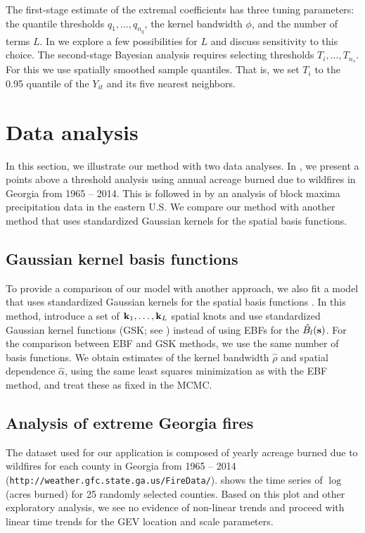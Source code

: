 The first-stage estimate of the extremal coefficients has three tuning parameters: the quantile thresholds $q_1,...,q_{n_q}$, the kernel bandwidth $\phi$, and the number of terms $L$.
In  we explore a few possibilities for $L$ and discuss sensitivity to this choice.
The second-stage Bayesian analysis requires selecting thresholds $T_i,...,T_{n_s}$.  For this we use spatially smoothed sample quantiles.
That is, we set $T_i$ to the 0.95 quantile of the $Y_{it}$ and its five nearest neighbors.

\section{Data analysis}\label{ebs:analysis}
In this section, we illustrate our method with two data analyses.
In , we present a points above a threshold analysis using annual acreage burned due to wildfires in Georgia from 1965 -- 2014.
This is followed in  by an analysis of block maxima precipitation data in the eastern U.S.
We compare our method with another method that uses standardized Gaussian kernels for the spatial basis functions.

\subsection{Gaussian kernel basis functions}
To provide a comparison of our model with another approach, we also fit a model that uses standardized Gaussian kernels for the spatial basis functions \citep{Reich2012}.
In this method, \citeauthor{Reich2012} introduce a set of $\mathbf{k}_1, \ldots, \mathbf{k}_L$ spatial knots and use standardized Gaussian kernel functions (GSK; see ) instead of using EBFs for the $\hat{B_l}(\mathbf{s})$.
For the comparison between EBF and GSK methods, we use the same number of basis functions.
We obtain estimates of the kernel bandwidth $\hat{\rho}$ and spatial dependence $\hat{\alpha}$, using the same least squares minimization as with the EBF method, and treat these as fixed in the MCMC.

\subsection{Analysis of extreme Georgia fires}\label{ebs:georgia}
The dataset used for our application is composed of yearly acreage burned due to wildfires for each county in Georgia from 1965 -- 2014 (\texttt{http://weather.gfc.state.ga.us/FireData/}).
 shows the time series of $\log$(acres burned) for 25 randomly selected counties.
Based on this plot and other exploratory analysis, we see no evidence of non-linear trends and proceed with linear time trends for the GEV location and scale parameters.

